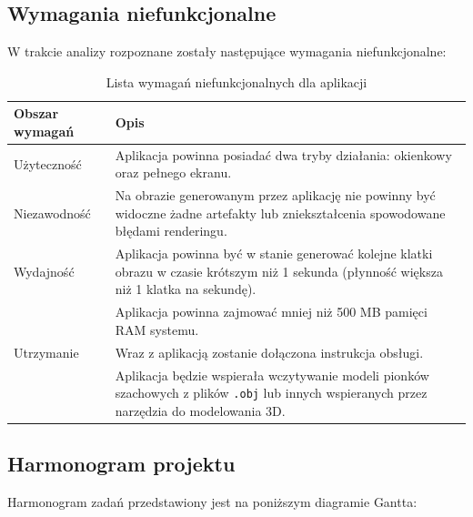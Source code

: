 \documentclass[10pt,a4paper]{article}
\begin{document}
\newpage

\subsection{Wymagania niefunkcjonalne}

W trakcie analizy rozpoznane zostały następujące wymagania niefunkcjonalne:

\begin{table}[H]
	\begin{tabularx}{\textwidth}{|l|X|}
		\hline
		\textbf{Obszar wymagań} & \textbf{Opis} \\
		\hline
		Użyteczność & Aplikacja powinna posiadać dwa tryby działania: okienkowy oraz pełnego ekranu. \\
		\hline
		Niezawodność & Na obrazie generowanym przez aplikację nie powinny być widoczne żadne artefakty lub zniekształcenia spowodowane błędami renderingu. \\
		\hline
		Wydajność & Aplikacja powinna być w stanie generować kolejne klatki obrazu w czasie krótszym niż 1 sekunda (płynność większa niż 1 klatka na sekundę). \\
		\cline{2-2}
		& Aplikacja powinna zajmować mniej niż 500 MB pamięci RAM systemu. \\
		\hline
		Utrzymanie & Wraz z aplikacją zostanie dołączona instrukcja obsługi. \\
		\cline{2-2}
		& Aplikacja będzie wspierała wczytywanie modeli pionków szachowych z plików \texttt{.obj} lub innych wspieranych przez narzędzia do modelowania 3D. \\
		\hline
	\end{tabularx}
	\caption{Lista wymagań niefunkcjonalnych dla aplikacji}
\end{table}

\subsection{Harmonogram projektu}

Harmonogram zadań przedstawiony jest na poniższym diagramie Gantta:
\end{document}
